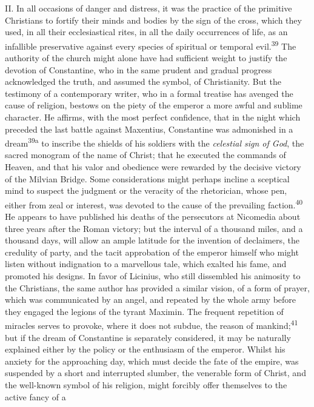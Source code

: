 II. In all occasions of danger and distress, it was the practice of the
primitive Christians to fortify their minds and bodies by the sign of
the cross, which they used, in all their ecclesiastical rites, in all
the daily occurrences of life, as an infallible preservative against
every species of spiritual or temporal evil.\textsuperscript{39} The authority of the
church might alone have had sufficient weight to justify the devotion
of Constantine, who in the same prudent and gradual progress
acknowledged the truth, and assumed the symbol, of Christianity. But
the testimony of a contemporary writer, who in a formal treatise has
avenged the cause of religion, bestows on the piety of the emperor a
more awful and sublime character. He affirms, with the most perfect
confidence, that in the night which preceded the last battle against
Maxentius, Constantine was admonished in a dream\textsuperscript{39a} to inscribe the
shields of his soldiers with the \textit{celestial sign of God}, the sacred
monogram of the name of Christ; that he executed the commands of
Heaven, and that his valor and obedience were rewarded by the decisive
victory of the Milvian Bridge. Some considerations might perhaps
incline a sceptical mind to suspect the judgment or the veracity of the
rhetorician, whose pen, either from zeal or interest, was devoted to
the cause of the prevailing faction.\textsuperscript{40} He appears to have published
his deaths of the persecutors at Nicomedia about three years after the
Roman victory; but the interval of a thousand miles, and a thousand
days, will allow an ample latitude for the invention of declaimers, the
credulity of party, and the tacit approbation of the emperor himself
who might listen without indignation to a marvellous tale, which
exalted his fame, and promoted his designs. In favor of Licinius, who
still dissembled his animosity to the Christians, the same author has
provided a similar vision, of a form of prayer, which was communicated
by an angel, and repeated by the whole army before they engaged the
legions of the tyrant Maximin. The frequent repetition of miracles
serves to provoke, where it does not subdue, the reason of mankind;\textsuperscript{41}
but if the dream of Constantine is separately considered, it may be
naturally explained either by the policy or the enthusiasm of the
emperor. Whilst his anxiety for the approaching day, which must decide
the fate of the empire, was suspended by a short and interrupted
slumber, the venerable form of Christ, and the well-known symbol of his
religion, might forcibly offer themselves to the active fancy of a
